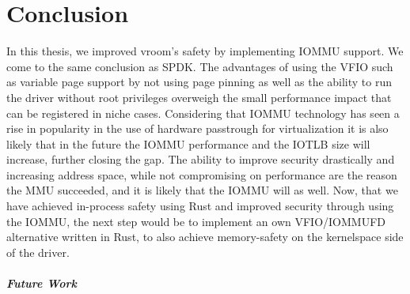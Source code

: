 \chapter{Conclusion}

In this thesis, we improved vroom's safety by implementing IOMMU support. We come to the same conclusion as SPDK. The advantages of using the VFIO such as variable page support by not using page pinning as well as the ability to run the driver without root privileges overweigh the small performance impact that can be registered in niche cases. Considering that IOMMU technology has seen a rise in popularity in the use of hardware passtrough for virtualization it is also likely that in the future the IOMMU performance and the IOTLB size will increase, further closing the gap. The ability to improve security drastically and increasing address space, while not compromising on performance are the reason the MMU succeeded, and it is likely that the IOMMU will as well. Now, that we have achieved in-process safety using Rust and improved security through using the IOMMU, the next step would be to implement an own VFIO/IOMMUFD alternative written in Rust, to also achieve memory-safety on the kernelspace side of the driver.

\paragraph{Future Work}